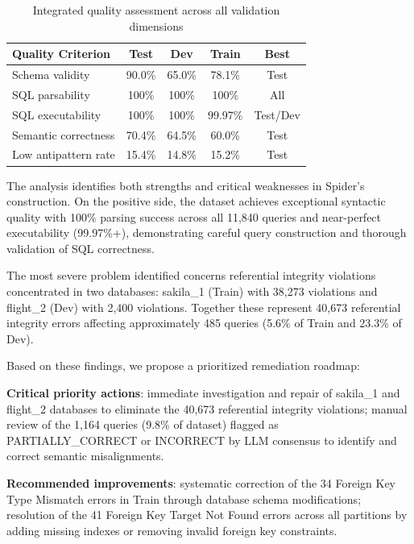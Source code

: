 \documentclass[]{einformatica}
\begin{document}
\begin{table}[ht]
    \caption{Integrated quality assessment across all validation dimensions}
    \label{tab:integrated}
    \centering
    \footnotesize
    \begin{tabular}{lcccc}
        \toprule
        \textbf{Quality Criterion} & \textbf{Test} & \textbf{Dev} & \textbf{Train} & \textbf{Best} \\
        \midrule
        Schema validity & 90.0\% & 65.0\% & 78.1\% & Test \\
        SQL parsability & 100\% & 100\% & 100\% & All \\
        SQL executability & 100\% & 100\% & 99.97\% & Test/Dev \\
        Semantic correctness & 70.4\% & 64.5\% & 60.0\% & Test \\
        Low antipattern rate & 15.4\% & 14.8\% & 15.2\% & Test \\
        \bottomrule
    \end{tabular}
\end{table}

The analysis identifies both strengths and critical weaknesses in Spider's construction. On the positive side, the dataset achieves exceptional syntactic quality with 100\% parsing success across all 11,840 queries and near-perfect executability (99.97\%+), demonstrating careful query construction and thorough validation of SQL correctness.

The most severe problem identified concerns referential integrity violations concentrated in two databases: sakila\_1 (Train) with 38,273 violations and flight\_2 (Dev) with 2,400 violations. Together these represent 40,673 referential integrity errors affecting approximately 485 queries (5.6\% of Train and 23.3\% of Dev).

Based on these findings, we propose a prioritized remediation roadmap:

\textbf{Critical priority actions}: immediate investigation and repair of sakila\_1 and flight\_2 databases to eliminate the 40,673 referential integrity violations; manual review of the 1,164 queries (9.8\% of dataset) flagged as PARTIALLY\_CORRECT or INCORRECT by LLM consensus to identify and correct semantic misalignments.

\textbf{Recommended improvements}: systematic correction of the 34 Foreign Key Type Mismatch errors in Train through database schema modifications; resolution of the 41 Foreign Key Target Not Found errors across all partitions by adding missing indexes or removing invalid foreign key constraints.
\end{document}
